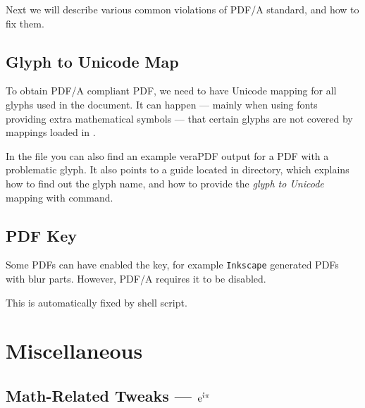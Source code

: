Next we will describe various common violations of PDF/A standard, and how to fix them.

\subsection{Glyph to Unicode Map}%
\label{sub:Glyph to Unicode Map}

To obtain PDF/A compliant PDF, we need to have Unicode mapping for all glyphs used in the document.
It can happen --- mainly when using fonts providing extra mathematical symbols --- that certain glyphs are not covered by mappings loaded in .

In the  file you can also find an example \textsf{veraPDF} output for a PDF with a problematic glyph.
It also points to a guide located in  directory, which explains how to find out the glyph name, and how to provide the \emph{glyph to Unicode} mapping with \macro{\pdfglyphtounicode} command.


\subsection{PDF \texorpdfstring{}{/Interpolation} Key}%
\label{sub:PDF Interpolation Key}

Some PDFs can have enabled the  key, for example \texttt{Inkscape} generated PDFs with blur parts.
However, PDF/A requires it to be disabled.

This is automatically fixed by  shell script.


\section{Miscellaneous}%
\label{sec:Miscellaneous}

\subsection{Math-Related Tweaks --- \texorpdfstring{\rmfamily\(\E^{\I\pi}\)}{exp(iπ)}}%
\label{sub:Math Macros}

